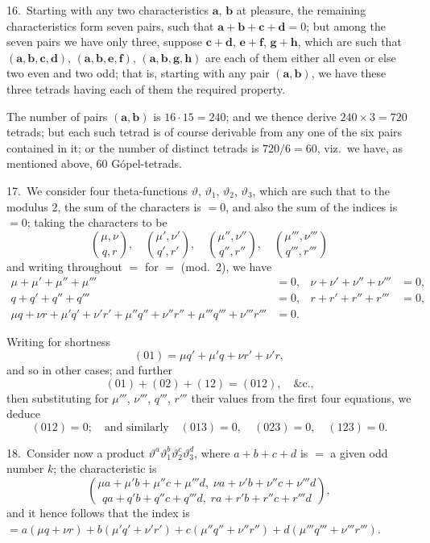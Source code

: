\documentclass[11pt,a4paper]{book}
\begin{document}
16.\ Starting with any two characteristics $\mathbf{a}$, $\mathbf{b}$ at pleasure, the remaining characteristics form seven pairs, such that $\mathbf{a} + \mathbf{b} + \mathbf{c} + \mathbf{d} = 0$; but among the seven pairs we have only three, suppose $\mathbf{c} + \mathbf{d}$, $\mathbf{e} + \mathbf{f}$, $\mathbf{g} + \mathbf{h}$, which are such that $(\mathbf{a}, \mathbf{b}, \mathbf{c}, \mathbf{d})$, $(\mathbf{a}, \mathbf{b}, \mathbf{e}, \mathbf{f})$, $(\mathbf{a}, \mathbf{b}, \mathbf{g}, \mathbf{h})$ are each of them either all even or else two even and two odd; that is, starting with any pair $(\mathbf{a}, \mathbf{b})$, we have these three tetrads having each of them the required property.

The number of pairs $(\mathbf{a}, \mathbf{b})$ is $16 \cdot 15 = 240$; and we thence derive $240 \times 3 = 720$ tetrads; but each such tetrad is of course derivable from any one of the six pairs contained in it; or the number of distinct tetrads is $720/6 = 60$, viz.\ we have, as mentioned above, 60 G\'{o}pel-tetrads.

\medskip

17.\ We consider four theta-functions $\vartheta$, $\vartheta_1$, $\vartheta_2$, $\vartheta_3$, which are such that to the modulus 2, the sum of the characters is $= 0$, and also the sum of the indices is $= 0$; taking the characters to be
\[
\binom{\mu, \nu}{q, r}, \quad \binom{\mu', \nu'}{q', r'}, \quad \binom{\mu'', \nu''}{q'', r''}, \quad \binom{\mu''', \nu'''}{q''', r'''}
\]
and writing throughout $=$ for $=$ (mod.~2), we have
\begin{align*}
\mu + \mu' + \mu'' + \mu''' &= 0, & \nu + \nu' + \nu'' + \nu''' &= 0,\\
q + q' + q'' + q''' &= 0, & r + r' + r'' + r''' &= 0,\\
\mu q + \nu r + \mu' q' + \nu' r' + \mu'' q'' + \nu'' r'' + \mu''' q''' + \nu''' r''' &= 0.
\end{align*}

Writing for shortness
\[
(01) = \mu q' + \mu' q + \nu r' + \nu' r,
\]
and so in other cases; and further
\[
(01) + (02) + (12) = (012), \quad \text{\&c.,}
\]
then substituting for $\mu'''$, $\nu'''$, $q'''$, $r'''$ their values from the first four equations, we deduce
\[
(012) = 0; \quad \text{and similarly} \quad (013) = 0, \quad (023) = 0, \quad (123) = 0.
\]

\medskip

18.\ Consider now a product $\vartheta^a\vartheta_1^b\vartheta_2^c\vartheta_3^d$, where $a + b + c + d$ is $=$ a given odd number $k$; the characteristic is
\[
\binom{\mu a + \mu' b + \mu'' c + \mu''' d,\; \nu a + \nu' b + \nu'' c + \nu''' d}{qa + q'b + q''c + q'''d,\; ra + r'b + r''c + r'''d},
\]
and it hence follows that the index is $= a(\mu q + \nu r) + b(\mu' q' + \nu' r') + c(\mu'' q'' + \nu'' r'') + d(\mu''' q''' + \nu''' r''')$.
\end{document}
